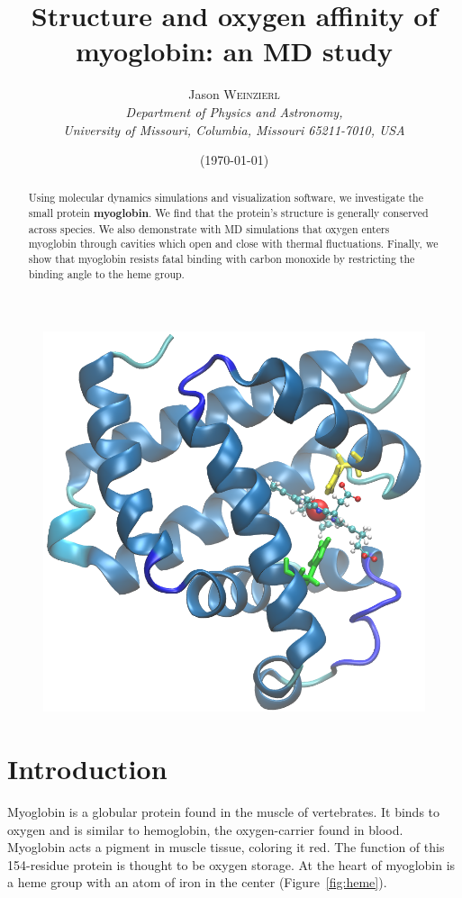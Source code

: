\documentclass{article}
\title{Structure and oxygen affinity of myoglobin: an MD study}
\author{Jason \textsc{Weinzierl} \\
\textit{Department of Physics and Astronomy,} \\
\textit{University of Missouri, Columbia, Missouri 65211-7010, USA}}
\date{(\today)}
\begin{document}
\maketitle

\begin{figure}[h]
	\centering
	\includegraphics{myoglobin.png}
\end{figure}

\begin{abstract}
Using molecular dynamics simulations and visualization software, we investigate the small protein \textbf{myoglobin}.  We find that the protein's structure is generally conserved across species.  We also demonstrate with MD simulations that oxygen enters myoglobin through cavities which open and close with thermal fluctuations.  Finally, we show that myoglobin resists fatal binding with carbon monoxide by restricting the binding angle to the heme group.
\end{abstract}

\section{Introduction}

Myoglobin is a globular protein found in the muscle of vertebrates.  It binds to oxygen and is similar to hemoglobin, the oxygen-carrier found in blood.  Myoglobin acts a pigment in muscle tissue, coloring it red.  The function of this 154-residue protein is thought to be oxygen storage.  At the heart of myoglobin is a heme group with an atom of iron in the center (Figure~\ref{fig:heme}).
\end{document}
